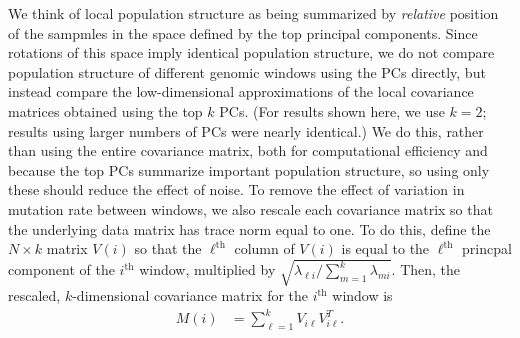 \documentclass[11pt, oneside]{article}   	%
\begin{document}
We think of local population structure as being summarized by \emph{relative} position of the sampmles
in the space defined by the top principal components.
Since rotations of this space imply identical population structure,
we do not compare population structure of different genomic windows using the PCs directly, 
but instead compare the low-dimensional approximations of the local covariance matrices
obtained using the top $k$ PCs.
(For results shown here, we use $k=2$;
results using larger numbers of PCs were nearly identical.)
We do this, rather than using the entire covariance matrix, 
both for computational efficiency 
and because the top PCs summarize important population structure, 
so using only these should reduce the effect of noise.
To remove the effect of variation in mutation rate between windows,
we also rescale each covariance matrix so that the underlying data matrix has trace norm equal to one.
To do this, define the $N \times k$ matrix $V(i)$ so that the $\ell^\text{th}$ column of $V(i)$
is equal to the $\ell^\text{th}$ princpal component of the $i^\text{th}$ window,
multiplied by $\sqrt{ \lambda_{\ell i} / \sum_{m=1}^k \lambda_{m i} }$.
Then, the rescaled, $k$-dimensional covariance matrix for the $i^\text{th}$ window is
\begin{align}
    M(i) &= \sum_{\ell=1}^k V_{i\ell} V_{i\ell}^T .
\end{align}
\end{document}
